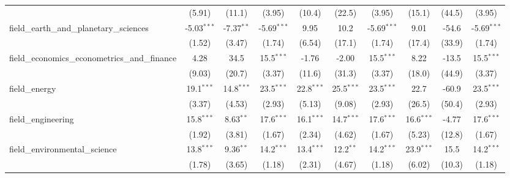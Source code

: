 \begin{tabular}{lccccccccc}
                                                               & (5.91)        & (11.1)        & (3.95)        & (10.4)       & (22.5)       & (3.95)        & (15.1)         & (44.5)         & (3.95)\\   
   field\_earth\_and\_planetary\_sciences                      & -5.03$^{***}$ & -7.37$^{**}$  & -5.69$^{***}$ & 9.95         & 10.2         & -5.69$^{***}$ & 9.01           & -54.6          & -5.69$^{***}$\\   
                                                               & (1.52)        & (3.47)        & (1.74)        & (6.54)       & (17.1)       & (1.74)        & (17.4)         & (33.9)         & (1.74)\\   
   field\_economics\_econometrics\_and\_finance                & 4.28          & 34.5          & 15.5$^{***}$  & -1.76        & -2.00        & 15.5$^{***}$  & 8.22           & -13.5          & 15.5$^{***}$\\   
                                                               & (9.03)        & (20.7)        & (3.37)        & (11.6)       & (31.3)       & (3.37)        & (18.0)         & (44.9)         & (3.37)\\   
   field\_energy                                               & 19.1$^{***}$  & 14.8$^{***}$  & 23.5$^{***}$  & 22.8$^{***}$ & 25.5$^{***}$ & 23.5$^{***}$  & 22.7           & -60.9          & 23.5$^{***}$\\   
                                                               & (3.37)        & (4.53)        & (2.93)        & (5.13)       & (9.08)       & (2.93)        & (26.5)         & (50.4)         & (2.93)\\   
   field\_engineering                                          & 15.8$^{***}$  & 8.63$^{**}$   & 17.6$^{***}$  & 16.1$^{***}$ & 14.7$^{***}$ & 17.6$^{***}$  & 16.6$^{***}$   & -4.77          & 17.6$^{***}$\\   
                                                               & (1.92)        & (3.81)        & (1.67)        & (2.34)       & (4.62)       & (1.67)        & (5.23)         & (12.8)         & (1.67)\\   
   field\_environmental\_science                               & 13.8$^{***}$  & 9.36$^{**}$   & 14.2$^{***}$  & 13.4$^{***}$ & 12.2$^{**}$  & 14.2$^{***}$  & 23.9$^{***}$   & 15.5           & 14.2$^{***}$\\   
                                                               & (1.78)        & (3.65)        & (1.18)        & (2.31)       & (4.67)       & (1.18)        & (6.02)         & (10.3)         & (1.18)\\   

\end{tabular}

